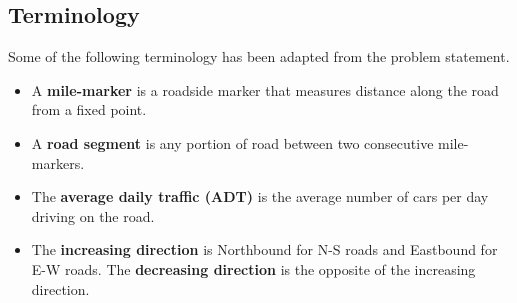 \subsection{Terminology}

Some of the following terminology has been adapted from the problem statement.

\begin{itemize}
\item A \textbf{mile-marker} is a roadside marker that measures distance along the road from a fixed point.
\item A \textbf{road segment} is any portion of road between two consecutive mile-markers.
\item The \textbf{average daily traffic (ADT)} is the average number of cars per day driving on the road.
\item The \textbf{increasing direction} is Northbound for N-S roads and Eastbound for E-W roads.  The \textbf{decreasing direction} is the opposite of the increasing direction.
\end{itemize}